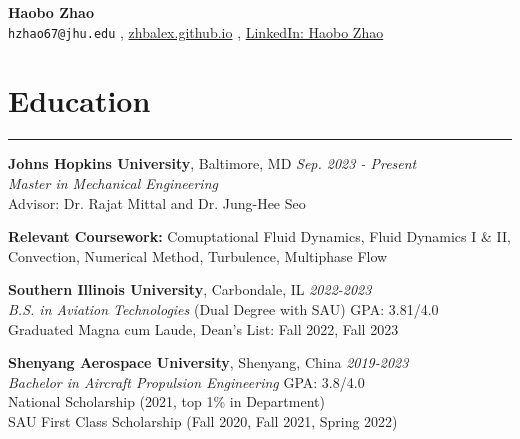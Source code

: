 \documentclass[10pt]{article} %
\begin{document}
\small


\begin{center}
    {\LARGE \textbf{Haobo Zhao}} \\
    \vspace{2mm}
    \small
    \texttt{hzhao67@jhu.edu} ,
    \href{https://zhbalex.github.io}{zhbalex.github.io} ,
    \href{https://www.linkedin.com/in/haobo-zhao-035529229}{LinkedIn: Haobo Zhao}
\end{center}

\vspace{2mm}

\section*{Education}
\hrule

\noindent\textbf{\normalsize{Johns Hopkins University}}, Baltimore, MD \hfill \textit{Sep. 2023 - Present} \\
\textsl{Master in Mechanical Engineering }\\
Advisor: Dr. Rajat Mittal and Dr. Jung-Hee Seo

\textbf{Relevant Coursework:} Comuptational Fluid Dynamics, Fluid Dynamics I \& II, Convection, Numerical Method, Turbulence, Multiphase Flow
\vspace{2mm}

\noindent\textbf{\normalsize{Southern Illinois University}}, Carbondale, IL \hfill \textit{2022-2023} \\
\textsl{B.S. in Aviation Technologies} (Dual Degree with SAU) \hfill  GPA: 3.81/4.0 \\
Graduated Magna cum Laude, Dean's List: Fall 2022, Fall 2023

\vspace{2mm}

\noindent\textbf{\normalsize{Shenyang Aerospace University}}, Shenyang, China \hfill \textit{2019-2023} \\
\textsl{Bachelor in Aircraft Propulsion Engineering} \hfill GPA: 3.8/4.0 \\
National Scholarship (2021, top 1\% in Department) \\
SAU First Class Scholarship (Fall 2020, Fall 2021, Spring 2022)

\vspace{2mm}
\end{document}
